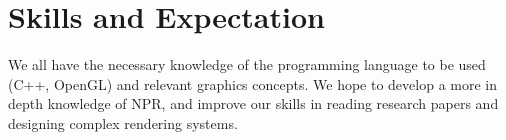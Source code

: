 \documentclass[acmtog, table, dvipsnames]{acmart}
\begin{document}
\section{Skills and Expectation}
We all have the necessary knowledge of the programming language to be used (C++, OpenGL) and relevant graphics concepts. We hope to develop a more in depth knowledge of NPR, and improve our skills in reading research papers and designing complex rendering systems.
%
%
%
%
%
%
%
%
%


\end{document}
